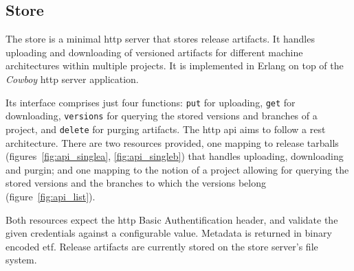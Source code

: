 {\cleardoublepage
\subsection{Store}

The store is a minimal \acrshort{http} server that stores release artifacts. It handles uploading and downloading of versioned artifacts for different machine architectures within multiple projects. It is implemented in Erlang on top of the \emph{Cowboy} \acrshort{http} server application.

Its interface comprises just four functions: \lstinline|put| for uploading, \lstinline|get| for downloading, \lstinline|versions| for querying the stored versions and branches of a project, and \lstinline|delete| for purging artifacts. The \acrshort{http} \acrshort{api} aims to follow a \acrfull{rest} architecture. There are two resources provided, one mapping to release tarballs (figures~\ref{fig:api_singlea}, \ref{fig:api_singleb}) that handles uploading, downloading and purgin; and one mapping to the notion of a project allowing for querying the stored versions and the branches to which the versions belong (figure~\ref{fig:api_list}).

Both resources expect the \acrshort{http} Basic Authentification header, and validate the given credentials against a configurable value. Metadata is returned in binary encoded \acrfull{etf}. Release artifacts are currently stored on the store server's file system.

}

